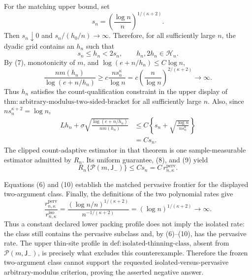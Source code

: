 For the matching upper bound, set
\[
 s_n=\left(\frac{\log n}{n}\right)^{1/(\kappa+2)}.
\]
Then \(s_n\downarrow0\) and \(s_n/(h_0/n)\to\infty\).  Therefore, for all sufficiently large \(n\), the dyadic grid contains an \(h_n\) such that
\[
 s_n\le h_n<2s_n,
 \qquad h_n,2h_n\in\mathcal H_n. \tag{7}
\]
By (7), monotonicity of \(m\), and \(\log(e+n/h_n)\le C\log n\),
\[
 \frac{nm(h_n)}{\log(e+n/h_n)}
 \ge c\frac{ns_n^\kappa}{\log n}
 =c\left(\frac n{\log n}\right)^{2/(\kappa+2)}
 \longrightarrow\infty. \tag{8}
\]
Thus \(h_n\) satisfies the count-qualification constraint in the upper display of \(\mathrm{thm:arbitrary\text{-}modulus\text{-}two\text{-}sided\text{-}bracket}\) for all sufficiently large \(n\).  Also, since \(ns_n^{\kappa+2}=\log n\),
\[
 \begin{aligned}
 Lh_n+\sigma\sqrt{\frac{\log(e+n/h_n)}{nm(h_n)}}
 &\le C\left\{s_n+
 \sqrt{\frac{\log n}{ns_n^\kappa}}\right\}\\
 &=Cs_n. 
 \end{aligned} \tag{9}
\]
The clipped count-adaptive estimator in that theorem is one sample-measurable estimator admitted by \(R_n\).  Its uniform guarantee, (8), and (9) yield
\[
 R_n\{\mathcal P(m,\mathsf J_{-})\}
 \le Cs_n
 =C\,r_{n,\kappa}^{\mathrm{perv}}. \tag{10}
\]

Equations (6) and (10) establish the matched pervasive frontier for the displayed two-argument class.  Finally, the definitions of the two polynomial rates give
\[
 \frac{r_{n,\kappa}^{\mathrm{perv}}}
 {r_{n,\kappa}^{\mathrm{iso}}}
 =\frac{(\log n/n)^{1/(\kappa+2)}}{n^{-1/(\kappa+2)}}
 =(\log n)^{1/(\kappa+2)}\longrightarrow\infty. \tag{11}
\]
Thus a constant declared lower packing profile does not imply the isolated rate: the class still contains the pervasive subclass and, by (6)--(10), has the pervasive rate.  The upper thin-site profile in \(\mathrm{def:isolated\text{-}thinning\text{-}class}\), absent from \(\mathcal P(m,\mathsf J_{-})\), is precisely what excludes this counterexample.  Therefore the frozen two-argument class cannot support the requested isolated-versus-pervasive arbitrary-modulus criterion, proving the asserted negative answer.